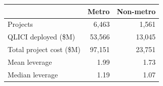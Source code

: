 \begin{tabular}{lrr}
\toprule
 & Metro & Non-metro \\
\midrule
Projects & 6,463 & 1,561 \\
QLICI deployed (\$M) & 53,566 & 13,045 \\
Total project cost (\$M) & 97,151 & 23,751 \\
Mean leverage & 1.99 & 1.73 \\
Median leverage & 1.19 & 1.07 \\
\bottomrule
\end{tabular}
